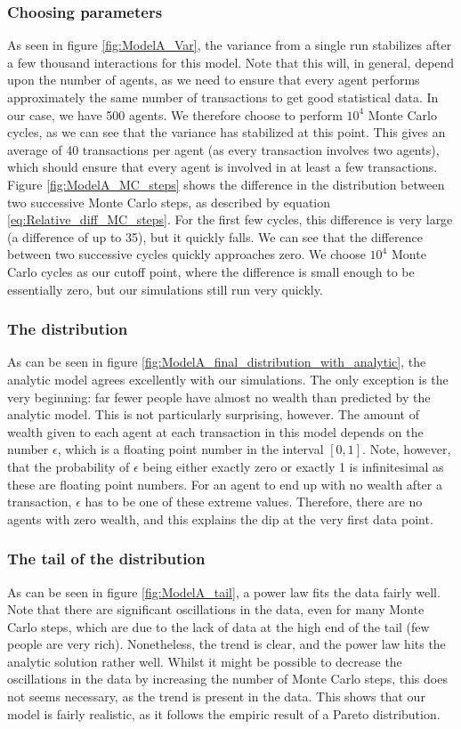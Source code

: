 \documentclass[a4paper, 10pt]{article}
\begin{document}
\subsubsection{Choosing parameters}
As seen in figure \ref{fig:ModelA_Var}, the variance from a single run stabilizes after a few thousand interactions for this model. Note that this will, in general, depend upon the number of agents, as we need to ensure that every agent performs approximately the same number of transactions to get good statistical data. In our case, we have 500 agents. We therefore choose to perform $10^4$ Monte Carlo cycles, as we can see that the variance has stabilized at this point. This gives an average of 40 transactions per agent (as every transaction involves two agents), which should ensure that every agent is involved in at least a few transactions.\\
\linebreak
Figure \ref{fig:ModelA_MC_steps} shows the difference in the distribution between two successive Monte Carlo steps, as described by equation \ref{eq:Relative_diff_MC_steps}. For the first few cycles, this difference is very large (a difference of up to 35), but it quickly falls. We can see that the difference between two successive cycles quickly approaches zero. We choose $10^4$ Monte Carlo cycles as our cutoff point, where the difference is small enough to be essentially zero, but our simulations still run very quickly.
\subsubsection{The distribution}
As can be seen in figure \ref{fig:ModelA_final_distribution_with_analytic}, the analytic model agrees excellently with our simulations. The only exception is the very beginning: far fewer people have almost no wealth than predicted by the analytic model. This is not particularly surprising, however. The amount of wealth given to each agent at each transaction in this model depends on the number $\epsilon$, which is a floating point number in the interval $[0,1]$. Note, however, that the probability of $\epsilon$ being either exactly zero or exactly 1 is infinitesimal as these are floating point numbers. For an agent to end up with no wealth after a transaction, $\epsilon$ has to be one of these extreme values. Therefore, there are no agents with zero wealth, and this explains the dip at the very first data point.
\subsubsection{The tail of the distribution}
As can be seen in figure \ref{fig:ModelA_tail}, a power law fits the data fairly well. Note that there are significant oscillations in the data, even for many Monte Carlo steps, which are due to the lack of data at the high end of the tail (few people are very rich). Nonetheless, the trend is clear, and the power law hits the analytic solution rather well. Whilst it might be possible to decrease the oscillations in the data by increasing the number of Monte Carlo steps, this does not seems necessary, as the trend is present in the data. This shows that our model is fairly realistic, as it follows the empiric result of a Pareto distribution.
\end{document}
